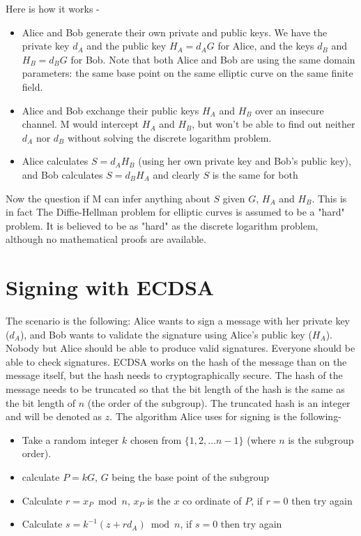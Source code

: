 \documentclass{article}
\begin{document}
Here is how it works -
\begin{itemize}
    \item Alice and Bob generate their own private and public keys. We have the private key $d_A$ and the public key $H_A=d_AG$ for Alice, and the keys $d_B$  and $H_B=d_BG$ for Bob. Note that both Alice and Bob are using the same domain parameters: the same base point on the same elliptic curve on the same finite field.
    \item Alice and Bob exchange their public keys $H_A$  and $H_B$ over an insecure channel. M would intercept $H_A$ and $H_B$, but won't be able to find out neither $d_A$ nor $d_B$ without solving the discrete logarithm problem.
    \item Alice calculates $S=d_AH_B$ (using her own private key and Bob's public key), and Bob calculates $S=d_BH_A$ and clearly $S$ is the same for both
\end{itemize}
Now the question if M can infer anything about $S$ given $G$, $H_A$ and $H_B$. This is in fact The Diffie-Hellman problem for elliptic curves is assumed to be a "hard" problem. It is believed to be as "hard" as the discrete logarithm problem, although no mathematical proofs are available.
\section{Signing with ECDSA}
The scenario is the following: Alice wants to sign a message with her private key ($d_A$), and Bob wants to validate the signature using Alice's public key ($H_A$). Nobody but Alice should be able to produce valid signatures. Everyone should be able to check signatures.
ECDSA works on the hash of the message than on the message itself, but the hash needs to cryptographically secure. The hash of the message needs to be truncated so that the bit length of the hash is the same as the bit length of $n$ (the order of the subgroup). The truncated hash is an integer and will be denoted as $z$. 
The algorithm Alice uses for signing is the following- 
\begin{itemize}
    \item Take a random integer $k$ chosen from $\{1,2,\dots n-1\}$ (where $n$ is the subgroup order).
    \item calculate $P=kG$, $G$ being the base point of the subgroup
    \item Calculate $r = x_P \bmod{n}$, $x_P$ is the $x$ co ordinate of $P$, if $r=0$ then try again
    \item Calculate $s = k^{-1} (z + rd_A) \bmod{n}$, if $s=0$ then try again
\end{itemize}
\end{document}
